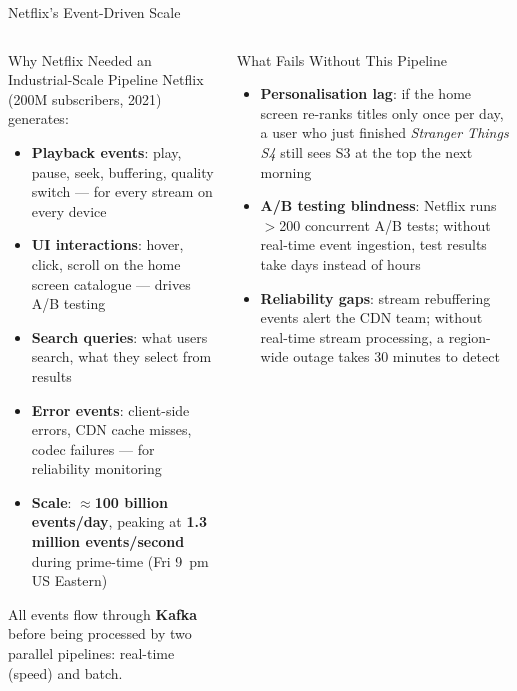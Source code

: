 \documentclass[aspectratio=169,10pt]{beamer}
\begin{document}
\begin{frame}{Netflix's Event-Driven Scale}
  \begin{columns}[T]
      \begin{block}{Why Netflix Needed an Industrial-Scale Pipeline}
        Netflix (200M subscribers, 2021) generates:
        \begin{itemize}
          \item \textbf{Playback events}: play, pause, seek, buffering,
                quality switch — for every stream on every device
          \item \textbf{UI interactions}: hover, click, scroll on the
                home screen catalogue — drives A/B testing
          \item \textbf{Search queries}: what users search, what they
                select from results
          \item \textbf{Error events}: client-side errors, CDN cache
                misses, codec failures — for reliability monitoring
          \item \textbf{Scale}: $\approx$\textbf{100 billion events/day},
                peaking at \textbf{1.3 million events/second}
                during prime-time (Fri 9~pm US Eastern)
        \end{itemize}
        All events flow through \textbf{Kafka} before being processed
        by two parallel pipelines: real-time (speed) and batch.
      \end{block}

      \begin{alertblock}{What Fails Without This Pipeline}
        \begin{itemize}
          \item \textbf{Personalisation lag}: if the home screen
                re-ranks titles only once per day, a user who just
                finished \textit{Stranger Things S4} still sees S3 at
                the top the next morning
          \item \textbf{A/B testing blindness}: Netflix runs
                $>$200 concurrent A/B tests; without real-time event
                ingestion, test results take days instead of hours
          \item \textbf{Reliability gaps}: stream rebuffering events
                alert the CDN team; without real-time stream processing,
                a region-wide outage takes 30 minutes to detect
        \end{itemize}
      \end{alertblock}
  \end{columns}
\end{frame}
\end{document}
